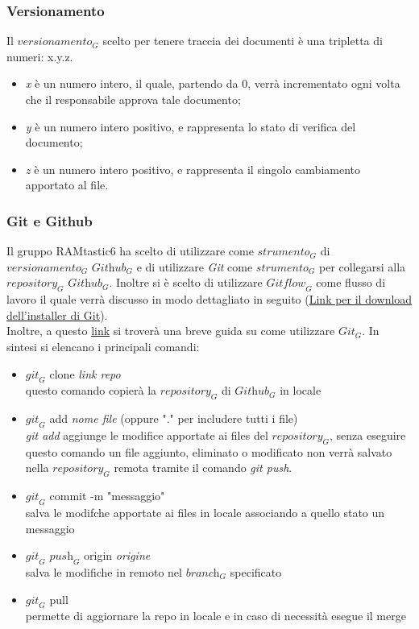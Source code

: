 \subsubsection{Versionamento}
Il $\textit{versionamento}_G$ scelto per tenere traccia dei documenti è una tripletta di numeri: x.y.z.

\begin{itemize}
    \item \textit{x} è un numero intero, il quale, partendo da 0, verrà incrementato ogni volta che il responsabile approva tale documento;
    \item \textit{y} è un numero intero positivo, e rappresenta lo stato di verifica del documento;
    \item \textit{z} è un numero intero positivo, e rappresenta il singolo cambiamento apportato al file.
\end{itemize}

\subsubsection{Git e Github}
Il gruppo RAMtastic6 ha scelto di utilizzare come $\textit{strumento}_G$ di $\textit{versionamento}_G$ \emph{$\textit{Github}_G$} e di utilizzare \emph{Git} come $\textit{strumento}_G$ per collegarsi alla $\textit{repository}_G$ $\textit{Github}_G$.
Inoltre si è scelto di utilizzare $\textit{Gitflow}_G$ come flusso di lavoro il quale verrà discusso in modo dettagliato in seguito
(\href{https://git-scm.com/downloads}{Link per il download dell'installer di Git}).\\
Inoltre, a questo \href{https://rogerdudler.github.io/git-guide/index.it.html}{link} si troverà una breve guida su come utilizzare $\textit{Git}_G$.
In sintesi si elencano i principali comandi:
\begin{itemize}
    \item $\textit{git}_G$ clone \emph{link repo}\\
    questo comando copierà la $\textit{repository}_G$ di $\textit{Github}_G$ in locale
    \item $\textit{git}_G$ add \emph{nome file} (oppure "." per includere tutti i file)\\
    \emph{git add} aggiunge le modifice apportate ai files del $\textit{repository}_G$, senza eseguire questo comando un file aggiunto, eliminato o modificato non verrà salvato nella $\textit{repository}_G$ remota tramite il comando \emph{git push}.
    \item $\textit{git}_G$ commit -m "messaggio" \\
    salva le modifche apportate ai files in locale associando a quello stato un messaggio
    \item $\textit{git}_G$ $\textit{push}_G$ origin \emph{origine} \\
    salva le modifiche in remoto nel $\textit{branch}_G$ specificato
    \item $\textit{git}_G$ pull \\
    permette di aggiornare la repo in locale e in caso di necessità esegue il merge
\end{itemize}

